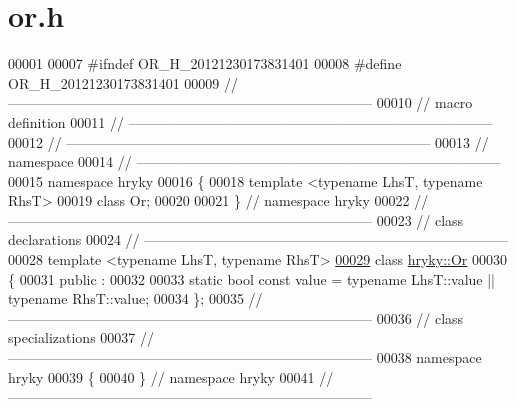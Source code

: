 \hypertarget{or_8h_source}{\section{or.\-h}
}

\begin{DoxyCode}
00001 
00007 \textcolor{preprocessor}{#ifndef OR\_H\_20121230173831401}
00008 \textcolor{preprocessor}{}\textcolor{preprocessor}{#define OR\_H\_20121230173831401}
00009 \textcolor{preprocessor}{}\textcolor{comment}{//
      ------------------------------------------------------------------------------}
00010 \textcolor{comment}{// macro definition}
00011 \textcolor{comment}{//
      ------------------------------------------------------------------------------}
00012 \textcolor{comment}{//
      ------------------------------------------------------------------------------}
00013 \textcolor{comment}{// namespace}
00014 \textcolor{comment}{//
      ------------------------------------------------------------------------------}
00015 \textcolor{keyword}{namespace }hryky
00016 \{
00018     \textcolor{keyword}{template} <\textcolor{keyword}{typename} LhsT, \textcolor{keyword}{typename} RhsT>
00019     \textcolor{keyword}{class }Or;
00020 
00021 \} \textcolor{comment}{// namespace hryky}
00022 \textcolor{comment}{//
      ------------------------------------------------------------------------------}
00023 \textcolor{comment}{// class declarations}
00024 \textcolor{comment}{//
      ------------------------------------------------------------------------------}
00028 \textcolor{comment}{}\textcolor{keyword}{template} <\textcolor{keyword}{typename} LhsT, \textcolor{keyword}{typename} RhsT>
\hypertarget{or_8h_source_l00029}{}\hyperlink{classhryky_1_1_or}{00029} \textcolor{keyword}{class }\hyperlink{classhryky_1_1_or}{hryky::Or}
00030 \{
00031 \textcolor{keyword}{public} :
00032 
00033     \textcolor{keyword}{static} \textcolor{keywordtype}{bool} \textcolor{keyword}{const} value = \textcolor{keyword}{typename} LhsT::value || \textcolor{keyword}{typename} RhsT::value;
00034 \};
00035 \textcolor{comment}{//
      ------------------------------------------------------------------------------}
00036 \textcolor{comment}{// class specializations}
00037 \textcolor{comment}{//
      ------------------------------------------------------------------------------}
00038 \textcolor{keyword}{namespace }hryky
00039 \{
00040 \} \textcolor{comment}{// namespace hryky}
00041 \textcolor{comment}{//
      ------------------------------------------------------------------------------}

\end{DoxyCode}
